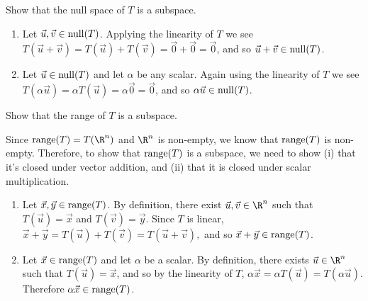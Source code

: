 \documentclass{problemset}
\begin{document}
	\begin{parts}
		\item Show that the null space of $T$ is a subspace.
			\begin{solution}
				\begin{enumerate}[label=(\roman*)]
					\item Let $\vec u,\vec v\in\operatorname{null}(T)$.
						Applying the linearity of $T$ we see
						$T(\vec u+\vec v)=T(\vec u)+T(\vec v)=\vec 0+\vec 0=\vec 0$,
						and so $\vec u+\vec v\in\operatorname{null}(T)$.
					\item Let $\vec u\in\operatorname{null}(T)$ and let $\alpha$ be any scalar.
						Again using the linearity of $T$ we see
						$T(\alpha\vec u)=\alpha T(\vec u)=\alpha\vec 0=\vec 0$,
						and so $\alpha\vec u\in\operatorname{null}(T)$.
				\end{enumerate}
			\end{solution}
		\item Show that the range of $T$ is a subspace.
			\begin{solution}
				Since $\Range(T)=T(\R^n)$ and $\R^n$ is non-empty, we know that $\operatorname{range}(T)$ is non-empty.
				Therefore, to show that $\operatorname{range}(T)$ is a subspace, we need to show (i) that it's closed under vector addition,
				and (ii) that it is closed under scalar multiplication.
				\begin{enumerate}[label=(\roman*)]
					\item Let $\vec x,\vec y\in\operatorname{range}(T)$.
						By definition, there exist $\vec u,\vec v\in\R^n$ such that $T(\vec u)=\vec x$
						and $T(\vec v)=\vec y$. Since $T$ is linear,
						$
							\vec x+\vec y=T(\vec u)+T(\vec v)=T(\vec u+\vec v),
						$
						and so $\vec x+\vec y\in\operatorname{range}(T)$.
					\item Let $\vec x\in\operatorname{range}(T)$ and let $\alpha$ be a scalar.
						By definition, there exists $\vec u\in\R^n$ such that $T(\vec u)=\vec x$,
						and so by the linearity of $T$,
						$
						\alpha\vec x=\alpha T(\vec u)=T(\alpha\vec u).
						$
						Therefore $\alpha\vec x\in\operatorname{range}(T)$.
				\end{enumerate}
			\end{solution}
	\end{parts}
\end{document}
